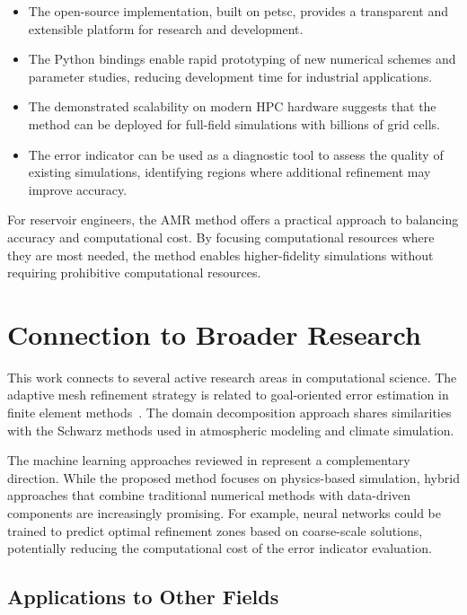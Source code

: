 \begin{itemize}
    \item The open-source implementation, built on \gls{petsc}, provides a transparent and extensible platform for research and development.

    \item The Python bindings enable rapid prototyping of new numerical schemes and parameter studies, reducing development time for industrial applications.

    \item The demonstrated scalability on modern HPC hardware suggests that the method can be deployed for full-field simulations with billions of grid cells.

    \item The error indicator can be used as a diagnostic tool to assess the quality of existing simulations, identifying regions where additional refinement may improve accuracy.
\end{itemize}

For reservoir engineers, the AMR method offers a practical approach to balancing accuracy and computational cost. By focusing computational resources where they are most needed, the method enables higher-fidelity simulations without requiring prohibitive computational resources.

\section{Connection to Broader Research}
\label{sec:discussion:broader}

This work connects to several active research areas in computational science. The adaptive mesh refinement strategy is related to goal-oriented error estimation in finite element methods~\cite{goossensLaTeXCompanion1993}. The domain decomposition approach shares similarities with the Schwarz methods used in atmospheric modeling and climate simulation.

The machine learning approaches reviewed in  represent a complementary direction. While the proposed method focuses on physics-based simulation, hybrid approaches that combine traditional numerical methods with data-driven components are increasingly promising. For example, neural networks could be trained to predict optimal refinement zones based on coarse-scale solutions, potentially reducing the computational cost of the error indicator evaluation.

\subsection{Applications to Other Fields}
\label{ssec:discussion:applications}

